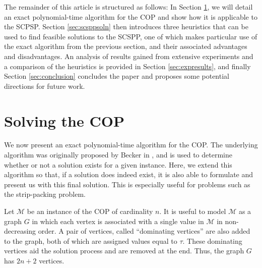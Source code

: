 \documentclass[runningheads]{llncs}
\begin{document}
\noindent The remainder of this article is structured as follows: In Section \ref{sec:ahc}, we will detail an exact polynomial-time algorithm for the COP and show how it is applicable to the SCPSP. Section \ref{sec:scsppsoln} then introduces three heuristics that can be used to find feasible solutions to the SCSPP, one of which makes particular use of the exact algorithm from the previous section, and their associated advantages and disadvantages. An analysis of results gained from extensive experiments and a comparison of the heuristics is provided in Section \ref{sec:expresults}, and finally Section \ref{sec:conclusion} concludes the paper and proposes some potential directions for future work.

\section{Solving the COP}
\label{sec:ahc}
We now present an exact polynomial-time algorithm for the COP. The underlying algorithm was originally proposed by Becker in \cite{becker2010}, and is used to determine whether or not a solution exists for a given instance. Here, we extend this algorithm so that, if a solution does indeed exist, it is also able to formulate and present us with this final solution. This is especially useful for problems such as the strip-packing problem.

Let $\mathcal{M}$ be an instance of the COP of cardinality $n$. It is useful to model $\mathcal{M}$ as a graph $G$ in which each vertex is associated with a single value in $\mathcal{M}$ in non-decreasing order. A pair of vertices, called ``dominating vertices'' are also added to the graph, both of which are assigned values equal to $\tau$. These dominating vertices aid the solution process and are removed at the end. Thus, the graph $G$ has $2n+2$ vertices.
\end{document}
